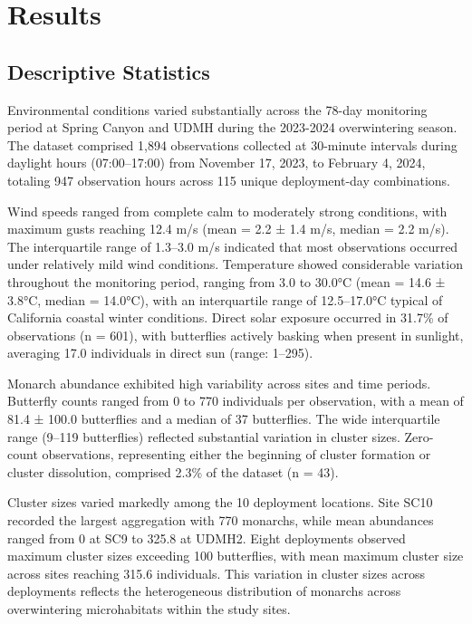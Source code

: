 \section{Results}

\subsection{Descriptive Statistics}

Environmental conditions varied substantially across the 78-day monitoring period at Spring Canyon and UDMH during the 2023-2024 overwintering season. The dataset comprised 1,894 observations collected at 30-minute intervals during daylight hours (07:00--17:00) from November 17, 2023, to February 4, 2024, totaling 947 observation hours across 115 unique deployment-day combinations.

Wind speeds ranged from complete calm to moderately strong conditions, with maximum gusts reaching 12.4 m/s (mean = 2.2 ± 1.4 m/s, median = 2.2 m/s). The interquartile range of 1.3--3.0 m/s indicated that most observations occurred under relatively mild wind conditions. Temperature showed considerable variation throughout the monitoring period, ranging from 3.0 to 30.0°C (mean = 14.6 ± 3.8°C, median = 14.0°C), with an interquartile range of 12.5--17.0°C typical of California coastal winter conditions. Direct solar exposure occurred in 31.7\% of observations (n = 601), with butterflies actively basking when present in sunlight, averaging 17.0 individuals in direct sun (range: 1--295).

Monarch abundance exhibited high variability across sites and time periods. Butterfly counts ranged from 0 to 770 individuals per observation, with a mean of 81.4 ± 100.0 butterflies and a median of 37 butterflies. The wide interquartile range (9--119 butterflies) reflected substantial variation in cluster sizes. Zero-count observations, representing either the beginning of cluster formation or cluster dissolution, comprised 2.3\% of the dataset (n = 43).

Cluster sizes varied markedly among the 10 deployment locations. Site SC10 recorded the largest aggregation with 770 monarchs, while mean abundances ranged from 0 at SC9 to 325.8 at UDMH2. Eight deployments observed maximum cluster sizes exceeding 100 butterflies, with mean maximum cluster size across sites reaching 315.6 individuals. This variation in cluster sizes across deployments reflects the heterogeneous distribution of monarchs across overwintering microhabitats within the study sites.

